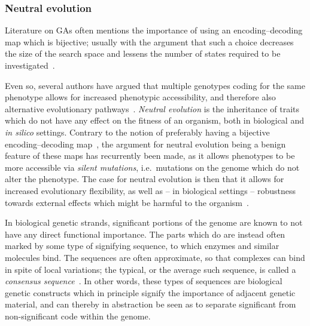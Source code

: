 \documentclass[a4paper,12pt]{article}
\theoremstyle{plain}
\theoremstyle{definition}
\begin{document}
         \subsubsection{Neutral evolution}
            Literature on GAs often mentions the importance of using an
            encoding--decoding map which is bijective; usually with the argument
            that such a choice decreases the size of the search space and 
            lessens the number of states required to be investigated~\cite{intro_to_evol_alg, tutorial}. 
            
            Even so, several authors have argued that multiple genotypes
            coding for the same phenotype allows for increased phenotypic
            accessibility, and therefore also alternative evolutionary
            pathways~\cite{topology_of_the_possible,pheno_acc,pheno_acc2,Shipman2000}.          
            \textit{Neutral evolution} is the inheritance of traits which do not have any
            effect on the fitness of an organism, both in biological and
            \textit{in silico} settings. Contrary to the notion of preferably
            having a bijective encoding--decoding map~\cite{intro_to_evol_alg}, 
            the argument for neutral evolution being a benign feature of these maps
            has recurrently been made, as it allows phenotypes to be more accessible 
            via \textit{silent mutations}, i.e.\ mutations on the genome 
            which do not alter the phenotype. 
            The case for neutral evolution is then that it allows for increased 
            evolutionary flexibility, as well as -- in biological settings -- robustness 
            towards external effects which might be harmful to the 
            organism~\cite{topology_of_the_possible,pheno_acc,pheno_acc2,pheno_acc3}. 

            In biological genetic strands, significant portions of
            the genome are known to not have any direct functional importance.
            The parts which do are instead often marked by some type of
            signifying sequence, to which enzymes and similar molecules bind. The sequences
            are often approximate, so that complexes can bind in spite of
            local variations; the typical, or the average such sequence, is called a 
            \textit{consensus sequence}~\cite{cons_seq}. 
            In other words, these types of sequences are biological genetic
            constructs which in principle signify the importance of adjacent genetic
            material, and can thereby in abstraction be seen as to
            separate significant from non-significant code within the genome.  
\end{document}

